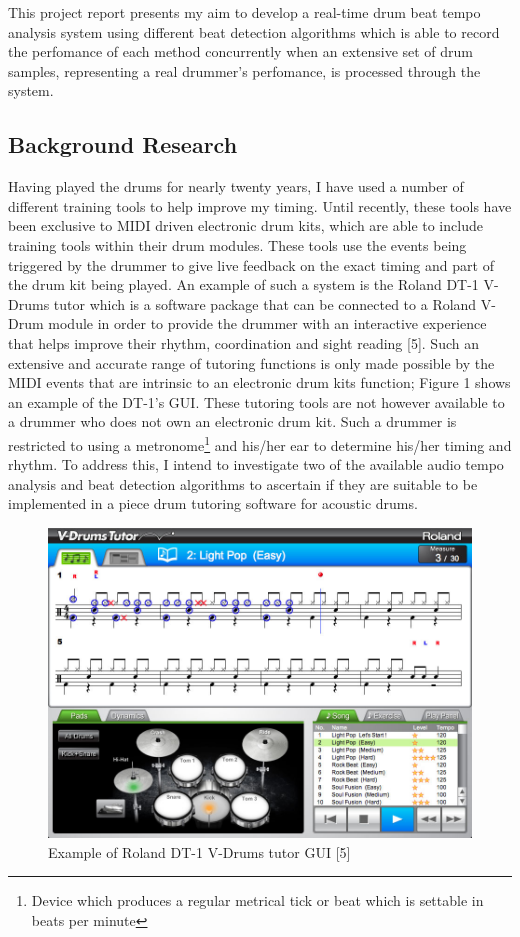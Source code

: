 \documentclass[a4paper, 11pt]{article}
\begin{document}
This project report presents my aim to develop a real-time drum beat tempo analysis system using different beat detection algorithms which is able to record the perfomance of each method concurrently when an extensive set of drum samples, representing a real drummer's perfomance, is processed through the system.

\maketitle{} \subsection{Background Research}
Having played the drums for nearly twenty years, I have used a number of different training tools to help improve my timing. Until recently, these tools have been exclusive to MIDI driven electronic drum kits, which are able to include training tools within their drum modules. These tools use the events being triggered by the drummer to give live feedback on the exact timing and part of the drum kit being played. An example of such a system is the Roland DT-1 V-Drums tutor which is a software package that can be connected to a Roland V-Drum module in order to provide the drummer with an interactive experience that helps improve their rhythm, coordination and sight reading [5]. Such an extensive and accurate range of tutoring functions is only made possible by the MIDI events that are intrinsic to an electronic drum kits function; Figure 1 shows an example of the DT-1's GUI. These tutoring tools are not however available to a drummer who does not own an electronic drum kit. Such a drummer is restricted to using a metronome\footnote{Device which produces a regular metrical tick or beat which is settable in beats per minute} and his/her ear to determine his/her timing and rhythm. To address this, I intend to investigate two of the available audio tempo analysis and beat detection algorithms to ascertain if they are suitable to be implemented in a piece drum tutoring software for acoustic drums.
\begin{figure}[h]
\caption{Example of Roland DT-1 V-Drums tutor GUI [5]}
	\centering
	\includegraphics[scale=0.25]{dt-1_ss_main_notation_gal}
\end{figure}
\end{document}
